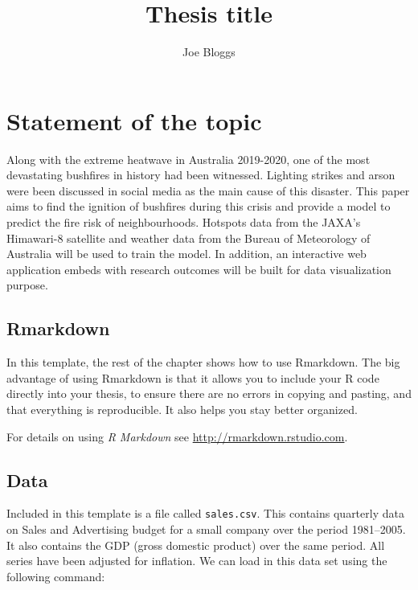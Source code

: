 \documentclass{monashthesis}
\author{Joe Bloggs}
\title{Thesis title}
\begin{document}

\titlepage

{\sf\tighttoc\doublespacing}

\clearpage{}\setcounter{page}{0}

\chapter{Statement of the topic}\label{ch:intro}

Along with the extreme heatwave in Australia 2019-2020, one of the most
devastating bushfires in history had been witnessed. Lighting strikes
and arson were been discussed in social media as the main cause of this
disaster. This paper aims to find the ignition of bushfires during this
crisis and provide a model to predict the fire risk of neighbourhoods.
Hotspots data from the JAXA's Himawari-8 satellite and weather data from
the Bureau of Meteorology of Australia will be used to train the model.
In addition, an interactive web application embeds with research
outcomes will be built for data visualization purpose.

\section{Rmarkdown}\label{rmarkdown}

In this template, the rest of the chapter shows how to use Rmarkdown.
The big advantage of using Rmarkdown is that it allows you to include
your R code directly into your thesis, to ensure there are no errors in
copying and pasting, and that everything is reproducible. It also helps
you stay better organized.

For details on using \emph{R Markdown} see
\url{http://rmarkdown.rstudio.com}.

\section{Data}\label{data}

Included in this template is a file called \texttt{sales.csv}. This
contains quarterly data on Sales and Advertising budget for a small
company over the period 1981--2005. It also contains the GDP (gross
domestic product) over the same period. All series have been adjusted
for inflation. We can load in this data set using the following command:

\begin{Shaded}
\begin{Highlighting}[]
\StringTok{ }\NormalTok{(}\NormalTok{(}\NormalTok{)[,}\OperatorTok{-}\NormalTok{], }\NormalTok{, }\NormalTok{)}
\end{Highlighting}
\end{Shaded}
\end{document}
